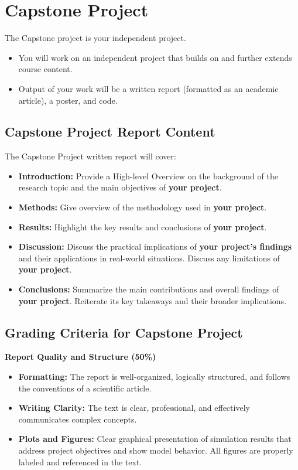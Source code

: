 \documentclass{article}
\begin{document}
\section{Capstone Project}
The Capstone project is your independent project.
\begin{itemize}
    \item You will work on an independent project that builds on and further extends course content.
    \item Output of your work will be a written report (formatted as an academic article), a poster, and code.
\end{itemize}

\subsection{Capstone Project Report Content}
The Capstone Project written report will cover:
{ %
\begin{itemize}
    \item \textbf{Introduction:} Provide a High-level Overview on the background of the research topic and the main objectives of \textbf{your project}.
    \item \textbf{Methods:} Give overview of the methodology used in \textbf{your project}.
    \item \textbf{Results:} Highlight the key results and conclusions of \textbf{your project}.
    \item \textbf{Discussion:} Discuss the practical implications of \textbf{your project's findings} and their applications in real-world situations. Discuss any limitations of \textbf{your project}.
    \item \textbf{Conclusions:} Summarize the main contributions and overall findings of \textbf{your project}. Reiterate its key takeaways and their broader implications.
\end{itemize}
}

\subsection{Grading Criteria for Capstone Project}
\textbf{Report Quality and Structure (50\%)}
{ %
\begin{itemize}
    \item \textbf{Formatting:} The report is well-organized, logically structured, and follows the conventions of a scientific article.
    \item \textbf{Writing Clarity:} The text is clear, professional, and effectively communicates complex concepts.
    \item \textbf{Plots and Figures:} Clear graphical presentation of simulation results that address project objectives and show model behavior. All figures are properly labeled and referenced in the text.
\end{itemize}
}
\end{document}
